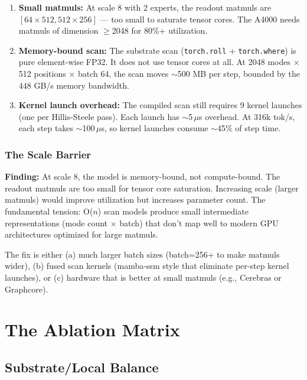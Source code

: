 \documentclass[11pt,a4paper]{report}
\newcommand{\finding}[1]{\textcolor{finding}{\textbf{Finding:}} #1}
\begin{document}
\begin{enumerate}[nosep]
\item \textbf{Small matmuls:} At scale 8 with 2 experts, the readout matmuls are $[64 \times 512, 512 \times 256]$ --- too small to saturate tensor cores. The A4000 needs matmuls of dimension $\geq$2048 for 80\%+ utilization.

\item \textbf{Memory-bound scan:} The substrate scan (\texttt{torch.roll} + \texttt{torch.where}) is pure element-wise FP32. It does not use tensor cores at all. At 2048 modes $\times$ 512 positions $\times$ batch 64, the scan moves $\sim$500 MB per step, bounded by the 448 GB/s memory bandwidth.

\item \textbf{Kernel launch overhead:} The compiled scan still requires 9 kernel launches (one per Hillis-Steele pass). Each launch has $\sim$5\,$\mu$s overhead. At 316k tok/s, each step takes $\sim$100\,$\mu$s, so kernel launches consume $\sim$45\% of step time.
\end{enumerate}

\section{The Scale Barrier}

\finding{At scale 8, the model is memory-bound, not compute-bound.} The readout matmuls are too small for tensor core saturation. Increasing scale (larger matmuls) would improve utilization but increases parameter count. The fundamental tension: O($n$) scan models produce small intermediate representations (mode count $\times$ batch) that don't map well to modern GPU architectures optimized for large matmuls.

The fix is either (a) much larger batch sizes (batch=256+ to make matmuls wider), (b) fused scan kernels (mamba-ssm style \cite{gu} that eliminate per-step kernel launches), or (c) hardware that is better at small matmuls (e.g., Cerebras or Graphcore).


\part{The Ablation Matrix}
\label{part:ablation}

\chapter{Substrate/Local Balance}
\label{ch:balance}
\end{document}

